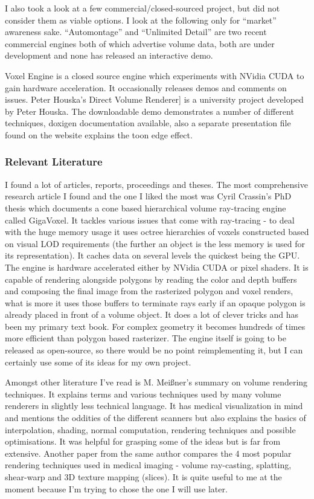 \documentclass[11pt,fleqn,twoside]{article}
\begin{document}
I also took a look at a few commercial/closed-sourced project, but did not consider them as viable options. I look at the following only for ``market'' awareness sake. ``Automontage''\cite{Automontage} and ``Unlimited Detail''\cite{UnlimitedDetail} are two recent commercial engines both of which advertise volume data, both are under development and none has released an interactive demo.

Voxel Engine\cite{VoxelEngineDevelopment} is a closed source engine which experiments with NVidia CUDA to gain hardware acceleration. It occasionally releases demos and comments on issues. Peter Houska's Direct Volume Renderer\cite{PHDVR}] is a university project developed by Peter Houska. The downloadable demo demonstrates a number of different techniques, doxigen documentation available, also a separate presentation file found on the website explains the toon edge effect.


\subsubsection{Relevant Literature}

I found a lot of articles, reports, proceedings and theses.
The most comprehensive research article I found and the one I liked the most was Cyril Crassin's PhD thesis\cite{CCrassinThesis} which documents a cone based hierarchical volume ray-tracing engine called GigaVoxel. It tackles various issues that come with ray-tracing - to deal with the huge memory usage it uses octree hierarchies of voxels constructed based on visual LOD requirements (the further an object is the less memory is used for its representation). It caches data on several levels the quickest being the GPU. The engine is hardware accelerated either by NVidia CUDA or pixel shaders. It is capable of rendering alongside polygons by reading the color and depth buffers and composing the final image from the rasterized  polygon and voxel renders, what is more it uses those buffers to terminate rays early if an opaque polygon is already placed in front of a volume object. It does a lot of clever tricks and has been my primary text book. For complex geometry it becomes hundreds of times more efficient than polygon based rasterizer. The engine itself is going to be released as open-source, so there would be no point reimplementing it, but I can certainly use some of its ideas for my own project.

Amongst other literature I've read is M. Mei\ss{}ner's summary on volume rendering techniques\cite{VolumeRenderingTut}. It explains terms and various techniques used by many volume renderers in slightly less technical language. It has medical visualization in mind and mentions the oddities of the different scanners but also explains the basics of interpolation, shading, normal computation, rendering techniques and possible optimisations. It was helpful for grasping some of the ideas but is far from extensive. Another paper from the same author\cite{AlgorithmComparison} compares the 4 most popular rendering techniques used in medical imaging - volume ray-casting, splatting, shear-warp and 3D texture mapping (slices). It is quite useful to me at the moment because I'm trying to chose the one I will use later.
\end{document}

